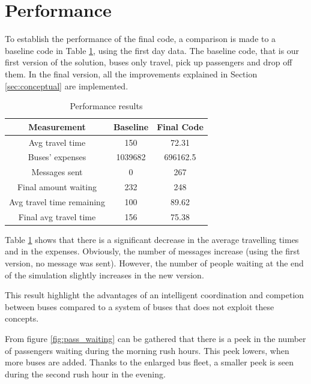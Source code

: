 \section{Performance}
To establish the performance of the final code, a comparison is made to a baseline code in Table \ref{table:table1}, using the first day data. The baseline code, that is our first version of the solution, buses only travel, pick up passengers and drop off them. In the final version, all the improvements explained in Section \ref{sec:conceptual} are implemented.

\begin{table}[htbp]
\centering
\begin{tabular}{ |c|c|c|  }
 \hline
  Measurement & Baseline & Final Code \\
 \hline
  Avg travel time & 150 & 72.31 \\
  Buses' expenses & 1039682 & 696162.5 \\
  Messages sent & 0 & 267  \\
  Final amount waiting & 232 & 248 \\
  Avg travel time remaining & 100 & 89.62 \\
  Final avg travel time & 156 & 75.38 \\
 \hline
\end{tabular}
\label{table:table1}
\caption{Performance results}
\end{table}

Table \ref{table:table1} shows that there is a significant decrease in the average travelling times and in the expenses. Obviously, the number of messages increase (using the first version, no message was sent). However, the number of people waiting at the end of the simulation slightly increases in the new version.

This result highlight the advantages of an intelligent coordination and competion between buses compared to a system of buses that does not exploit these concepts.

From figure \ref{fig:pass_waiting} can be gathered that there is a peek in the number of passengers waiting during the morning rush hours. This peek lowers, when more buses are added. Thanks to the enlarged bus fleet, a smaller peek is seen during the second rush hour in the evening.

